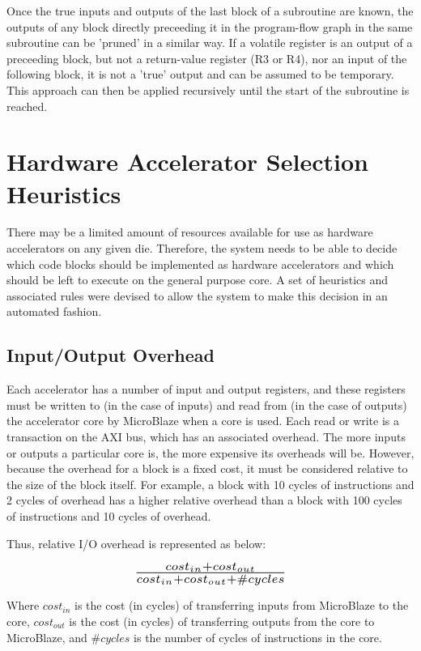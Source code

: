 \documentclass{UoYCSproject}
\begin{document}
Once the true inputs and outputs of the last block of a subroutine are known, the outputs of any block directly preceeding it in
the program-flow graph in the same subroutine can be 'pruned' in a similar way. If a volatile register is an output of a
preceeding block, but not a return-value register (R3 or R4), nor an input of the following block, it is not a 'true' output and
can be assumed to be temporary. This approach can then be applied recursively until the start of the subroutine is reached.

\section{Hardware Accelerator Selection Heuristics}

There may be a limited amount of resources available for use as hardware accelerators on any given die. Therefore,
the system needs to be able to decide which code blocks should be implemented as hardware accelerators and which
should be left to execute on the general purpose core. A set of heuristics and associated rules were devised to allow
the system to make this decision in an automated fashion.

\subsection{Input/Output Overhead}

Each accelerator has a number of input and output registers, and these registers must be written to (in the case of inputs)
and read from (in the case of outputs) the accelerator core by MicroBlaze when a core is used. Each read or write is a transaction
on the AXI bus, which has an associated overhead. The more inputs or outputs a particular core is, the more expensive its
overheads will be. However, because the overhead for a block is a fixed cost, it must be considered relative to the size of the
block itself. For example, a block with 10 cycles of instructions and 2 cycles of overhead has a higher relative overhead
than a block with 100 cycles of instructions and 10 cycles of overhead.

Thus, relative I/O overhead is represented as below:

\begin{equation}
\scalebox{1.5}{$\frac{cost_{in} + cost_{out}}{cost_{in} + cost_{out} + \#cycles}$}
\end{equation}

Where \(cost_{in}\) is the cost (in cycles) of transferring inputs from MicroBlaze to the core, \(cost_{out}\) is the cost
(in cycles) of transferring outputs from the core to MicroBlaze, and \(\#cycles\) is the number of cycles of instructions in the
core.
\end{document}
